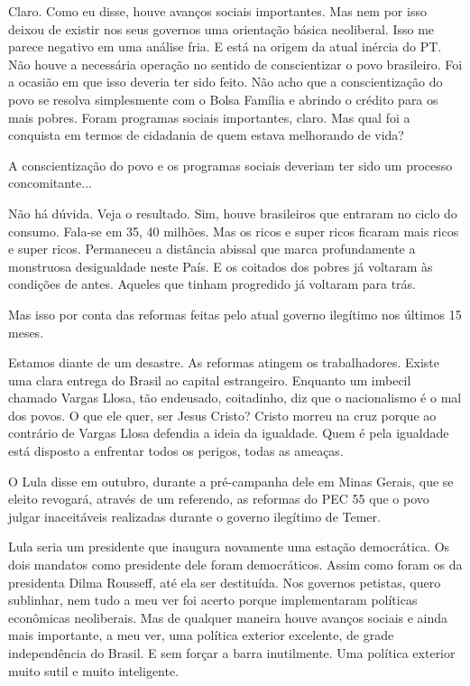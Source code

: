  Claro. Como eu disse, houve avanços sociais importantes. Mas nem por
isso deixou de existir nos seus governos uma orientação básica
neoliberal. Isso me parece negativo em uma análise fria. E está na
origem da atual inércia do PT. Não houve a necessária operação no
sentido de conscientizar o povo brasileiro. Foi a ocasião em que isso
deveria ter sido feito. Não acho que a conscientização do povo se
resolva simplesmente com o Bolsa Família e abrindo o crédito para os
mais pobres. Foram programas sociais importantes, claro. Mas qual foi a
conquista em termos de cidadania de quem estava melhorando de vida?

 A conscientização do povo e os programas sociais deveriam ter sido um
processo concomitante...

 Não há dúvida. Veja o resultado. Sim, houve brasileiros que entraram
no ciclo do consumo. Fala-se em 35, 40 milhões. Mas os ricos e super
ricos ficaram mais ricos e super ricos. Permaneceu a distância abissal
que marca profundamente a monstruosa desigualdade neste País. E os
coitados dos pobres já voltaram às condições de antes. Aqueles que
tinham progredido já voltaram para trás.

 Mas isso por conta das reformas feitas pelo atual governo ilegítimo
nos últimos 15 meses.

 Estamos diante de um desastre. As reformas atingem os trabalhadores.
Existe uma clara entrega do Brasil ao capital estrangeiro. Enquanto um
imbecil chamado Vargas Llosa, tão endeusado, coitadinho, diz que o
nacionalismo é o mal dos povos. O que ele quer, ser Jesus Cristo? Cristo
morreu na cruz porque ao contrário de Vargas Llosa defendia a ideia da
igualdade. Quem é pela igualdade está disposto a enfrentar todos os
perigos, todas as ameaças.

 O Lula disse em outubro, durante a pré-campanha dele em Minas Gerais,
que se eleito revogará, através de um referendo, as reformas do PEC 55
que o povo julgar inaceitáveis realizadas durante o governo ilegítimo de
Temer.

 Lula seria um presidente que inaugura novamente uma estação
democrática. Os dois mandatos como presidente dele foram democráticos.
Assim como foram os da presidenta Dilma Rousseff, até ela ser
destituída. Nos governos petistas, quero sublinhar, nem tudo a meu ver
foi acerto porque implementaram políticas econômicas neoliberais. Mas de
qualquer maneira houve avanços sociais e ainda mais importante, a meu
ver, uma política exterior excelente, de grade independência do Brasil.
E sem forçar a barra inutilmente. Uma política exterior muito sutil e
muito inteligente.

